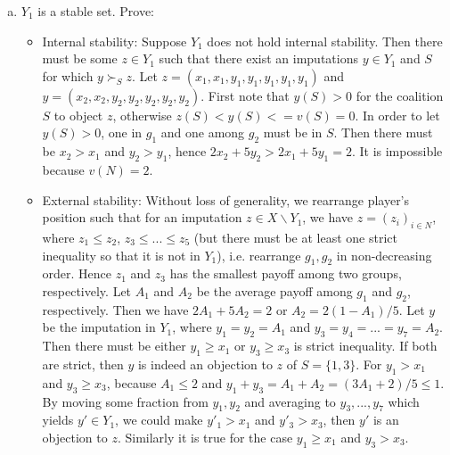 \documentclass[a4paper,12pt]{article}
\begin{document}
\begin{enumerate}
\begin{enumerate}[(a)]
  \item
  $Y_1$ is a stable set. Prove:
  \begin{itemize}
    \item
        Internal stability: Suppose $Y_1$ does not hold internal stability.
        Then there must be some $z \in Y_1$ such that there exist an imputations $y \in Y_1$ and $S$ for which $y \succ_S z$.
        Let $z=(x_1,x_1,y_1,y_1,y_1,y_1,y_1)$ and $y=(x_2,x_2,y_2,y_2,y_2,y_2,y_2)$.
        First note that $y(S)>0$ for the coalition $S$ to object $z$, otherwise $z(S)<y(S)<=v(S)=0$.
        In order to let $y(S)>0$, one in $g_1$ and one among $g_2$ must be in $S$.
        Then there must be $x_2>x_1$ and $y_2>y_1$, hence $2x_2+5y_2>2x_1+5y_1=2$.
        It is impossible because $v(N)=2$.
    \item
        External stability: Without loss of generality, we rearrange player's position such that for an imputation $z \in X \backslash Y_1$,
        we have $z=(z_i)_{i\in N}$, where $z_1 \le z_2$, $z_3 \le ... \le z_5$
        (but there must be at least one strict inequality so that it is not in $Y_1$),
        i.e. rearrange $g_1,g_2$ in non-decreasing order.
        Hence $z_1$ and $z_3$ has the smallest payoff among two groups, respectively.
        Let $A_1$ and $A_2$ be the average payoff among $g_1$ and $g_2$, respectively.
        Then we have $2A_1+5A_2=2$ or $A_2=2(1-A_1)/5$.
        Let $y$ be the imputation in $Y_1$, where $y_1=y_2=A_1$ and $y_3=y_4=...=y_7=A_2$.
        Then there must be either $y_1 \ge x_1$ or $y_3 \ge x_3$ is strict inequality.
        If both are strict, then $y$ is indeed an objection to $z$ of $S=\{1,3\}$.
        For $y_1 > x_1$ and $y_3 \ge x_3$,
        because $A_1 \le 2$ and $y_1+y_3=A_1+A_2=(3A_1+2)/5 \le 1$.
        By moving some fraction from $y_1,y_2$ and averaging to $y_3,...,y_7$ which yields $y' \in Y_1$,
        we could make $y'_1 > x_1$ and $y'_3 > x_3$, then $y'$ is an objection to $z$.
        Similarly it is true for the case $y_1 \ge x_1$ and $y_3 > x_3$.


\end{itemize}
\end{enumerate}
\end{enumerate}
\end{document}
